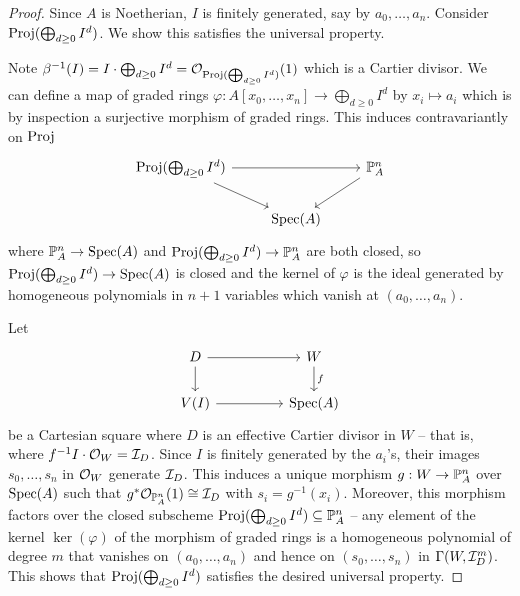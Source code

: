 \begin{proof}
    Since $A$ is Noetherian, $I$ is finitely generated, say by $a_{0},\dots,a_{n}$. Consider $\operatorname{Proj}(\bigoplus_{d\geq0}I^{d})$. We show this satisfies the universal property. 

    Note $\beta^{-1}(I)=I\cdot\bigoplus_{d\geq0}I^{d}=\mathcal{O}_{\operatorname{Proj}(\bigoplus_{d\geq0}I^{d})}(1)$ which is a Cartier divisor. We can define a map of graded rings $\varphi:A[x_{0},\dots,x_{n}]\to\bigoplus_{d\geq0}I^{d}$ by $x_{i}\mapsto a_{i}$ which is by inspection a surjective morphism of graded rings. This induces contravariantly on $\operatorname{Proj}$ 
    $$%
    \begin{tikzcd}
        {\proj(\bigoplus_{d\geq0}I^{d})} && {\PP^{n}_{A}} \\
        & {\spec(A)}
        \arrow[from=1-1, to=1-3]
        \arrow[from=1-1, to=2-2]
        \arrow[from=1-3, to=2-2]
    \end{tikzcd}$$
    where $\mathbb{P}^{n}_{A}\to\operatorname{Spec}(A)$ and $\operatorname{Proj}(\bigoplus_{d\geq0}I^{d})\to\mathbb{P}^{n}_{A}$ are both closed, so $\operatorname{Proj}(\bigoplus_{d\geq0}I^{d})\to\operatorname{Spec}(A)$ is closed and the kernel of $\varphi$ is the ideal generated by homogeneous polynomials in $n+1$ variables which vanish at $(a_{0},\dots,a_{n})$. 
    
    Let 
    $$%
    \begin{tikzcd}
        D && W \\
        {V(I)} && {\spec(A)}
        \arrow[from=1-1, to=1-3]
        \arrow[from=1-1, to=2-1]
        \arrow["f", from=1-3, to=2-3]
        \arrow[from=2-1, to=2-3]
    \end{tikzcd}$$
    be a Cartesian square where $D$ is an effective Cartier divisor in $W$ -- that is, where $f^{-1}I\cdot\mathcal{O}_{W}=\mathcal{I}_{D}$. Since $I$ is finitely generated by the $a_{i}$'s, their images $s_{0},\dots,s_{n}$ in $\mathcal{O}_{W}$ generate $\mathcal{I}_{D}$. This induces a unique morphism $g:W\to\mathbb{P}^{n}_{A}$ over $\operatorname{Spec}(A)$ such that $g^{*}\mathcal{O}_{\mathbb{P}^{n}_{A}}(1)\cong\mathcal{I}_{D}$ with $s_{i}=g^{-1}(x_{i})$. Moreover, this morphism factors over the closed subscheme $\operatorname{Proj}(\bigoplus_{d\geq0}I^{d})\subseteq\mathbb{P}^{n}_{A}$ -- any element of the kernel $\ker(\varphi)$ of the morphism of graded rings is a homogeneous polynomial of degree $m$ that vanishes on $(a_{0},\dots,a_{n})$ and hence on $(s_{0},\dots,s_{n})$ in $\Gamma(W,\mathcal{I}_{D}^{m})$. This shows that $\operatorname{Proj}(\bigoplus_{d\geq0}I^{d})$ satisfies the desired universal property. 
\end{proof}
